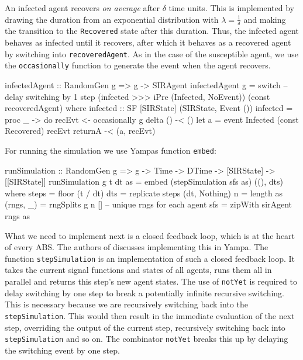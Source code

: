 An infected agent recovers \textit{on average} after $\delta$ time units. This is implemented by drawing the duration from an exponential distribution \cite{borshchev_system_2004} with $\lambda = \frac{1}{\delta}$ and making the transition to the \texttt{Recovered} state after this duration. Thus, the infected agent behaves as infected until it recovers, after which it behaves as a recovered agent by switching into \texttt{recoveredAgent}. As in the case of the susceptible agent, we use the \texttt{occasionally} function to generate the event when the agent recovers.

\begin{HaskellCode}
infectedAgent :: RandomGen g => g -> SIRAgent
infectedAgent g 
    = switch 
      -- delay switching by 1 step 
      (infected >>> iPre (Infected, NoEvent))
      (const recoveredAgent)
  where
    infected :: SF [SIRState] (SIRState, Event ())
    infected = proc _ -> do
      recEvt <- occasionally g delta () -< ()
      let a = event Infected (const Recovered) recEvt
      returnA -< (a, recEvt)
\end{HaskellCode}

For running the simulation we use Yampas function \texttt{embed}:

\begin{HaskellCode}
runSimulation :: RandomGen g => g -> Time -> DTime -> [SIRState] -> [[SIRState]]
runSimulation g t dt as 
    = embed (stepSimulation sfs as) ((), dts)
  where
    steps     = floor (t / dt)
    dts       = replicate steps (dt, Nothing)
    n         = length as
    (rngs, _) = rngSplits g n [] -- unique rngs for each agent
    sfs       = zipWith sirAgent rngs as
\end{HaskellCode}

What we need to implement next is a closed feedback loop, which is at the heart of every ABS. The authors of \cite{courtney_yampa_2003, nilsson_functional_2002} discusses implementing this in Yampa. The function \texttt{stepSimulation} is an implementation of such a closed feedback loop. It takes the current signal functions and states of all agents, runs them all in parallel and returns this step's new agent states. The use of \texttt{notYet} is required to delay switching by one step to break a potentially infinite recursive switching. This is necessary because we are recursively switching back into the \texttt{stepSimulation}. This would then result in the immediate evaluation of the next step, overriding the output of the current step, recursively switching back into \texttt{stepSimulation} and so on. The combinator \texttt{notYet} breaks this up by delaying the switching event by one step.

